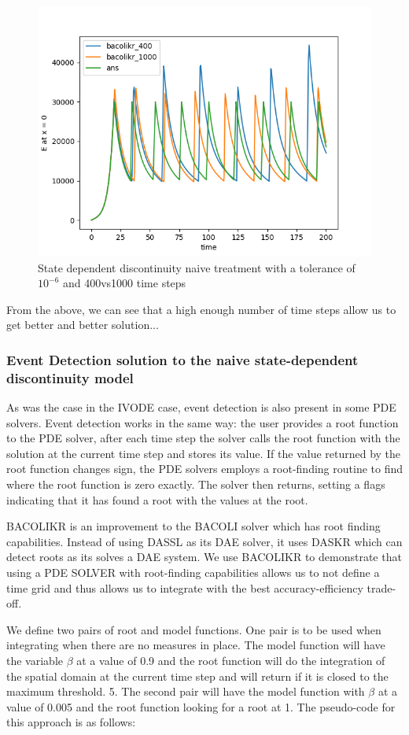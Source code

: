 \documentclass{article}
\begin{document}
\begin{figure}[H]
\centering
\includegraphics[width=0.7\linewidth]{./figures/pde_state_disc_naive_400vs1000}
\caption{State dependent discontinuity naive treatment with a tolerance of $10^{-6}$ and 400vs1000 time steps}
\label{fig:pde_state_disc_naive_400vs1000}
\end{figure}
 
From the above, we can see that a high enough number of time steps allow us to get better and better solution...

\subsubsection{Event Detection solution to the naive state-dependent discontinuity model}
\label{subsubsection:pde_state_event_detection}
As was the case in the IVODE case, event detection is also present in some PDE solvers. Event detection works in the same way: the user provides a root function to the PDE solver, after each time step the solver calls the root function with the solution at the current time step and stores its value. If the value returned by the root function changes sign, the PDE solvers employs a root-finding routine to find where the root function is zero exactly. The solver then returns, setting a flags indicating that it has found a root with the values at the root.
 
BACOLIKR is an improvement to the BACOLI solver which has root finding capabilities. Instead of using DASSL as its DAE solver, it uses DASKR which can detect roots as its solves a DAE system. We use BACOLIKR to demonstrate that using a PDE SOLVER with root-finding capabilities allows us to not define a time grid and thus allows us to integrate with the best accuracy-efficiency trade-off.  

We define two pairs of root and model functions. One pair is to be used when integrating when there are no measures in place. The model function will have the variable $\beta$ at a value of 0.9 and the root function will do the integration of the spatial domain at the current time step and will return if it is closed to the maximum threshold. 5. The second pair will have the model function with $\beta$ at a value of 0.005 and the root function looking for a root at 1. The pseudo-code for this approach is as follows:
\end{document}
